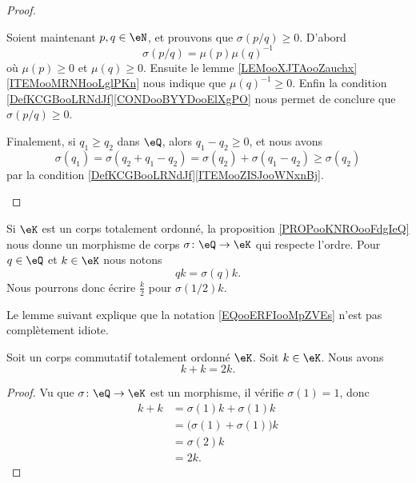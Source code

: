 \begin{proof}
\begin{subproof}
		Soient maintenant \( p,q\in \eN\), et prouvons que \( \sigma(p/q)\geq 0\). D'abord
		\begin{equation}
			\sigma(p/q)=\mu(p)\mu(q)^{-1}
		\end{equation}
		où \( \mu(p)\geq 0\) et \( \mu(q)\geq 0\). Ensuite le lemme \ref{LEMooXJTAooZauchx}\ref{ITEMooMRNHooLglPKn} nous indique que \( \mu(q)^{-1}\geq 0\). Enfin la condition \ref{DefKCGBooLRNdJf}\ref{CONDooBYYDooElXgPO} nous permet de conclure que \( \sigma(p/q)\geq 0\).

		Finalement, si \( q_1\geq q_2\) dans \( \eQ\), alors \( q_1-q_2\geq 0\), et nous avons
		\begin{equation}
			\sigma(q_1)=\sigma(q_2+q_1-q_2)=\sigma(q_2)+\sigma(q_1-q_2)\geq \sigma(q_2)
		\end{equation}
		par la condition \ref{DefKCGBooLRNdJf}\ref{ITEMooZISJooWNxnBj}.
	\end{subproof}
\end{proof}


\begin{normaltext}      \label{NORMooJRRZooTwTVYG}
	Si \( \eK\) est un corps totalement ordonné, la proposition \ref{PROPooKNROooFdgIeQ} nous donne un morphisme de corps \( \sigma\colon \eQ\to \eK\) qui respecte l'ordre. Pour \( q\in \eQ\) et \( k\in \eK\) nous notons
	\begin{equation}        \label{EQooERFIooMpZVEs}
		qk=\sigma(q)k.
	\end{equation}
	Nous pourrons donc écrire \( \frac{ k }{2}\) pour \( \sigma(1/2)k\).
\end{normaltext}

Le lemme suivant explique que la notation \eqref{EQooERFIooMpZVEs} n'est pas complètement idiote.
\begin{lemma}       \label{LEMooWIONooGTKfcJ}
	Soit un corps commutatif totalement ordonné \( \eK\). Soit \( k\in \eK\). Nous avons
	\begin{equation}
		k+k=2k.
	\end{equation}
\end{lemma}

\begin{proof}
	Vu que \(  \sigma\colon \eQ\to \eK \) est un morphisme, il vérifie \( \sigma(1)=1\), donc
	\begin{subequations}
		\begin{align}
			k+k & =\sigma(1)k+\sigma(1)k            \\
			    & =\big( \sigma(1)+\sigma(1) \big)k \\
			    & =\sigma(2)k                       \\
			    & =2k.
		\end{align}
	\end{subequations}
\end{proof}


